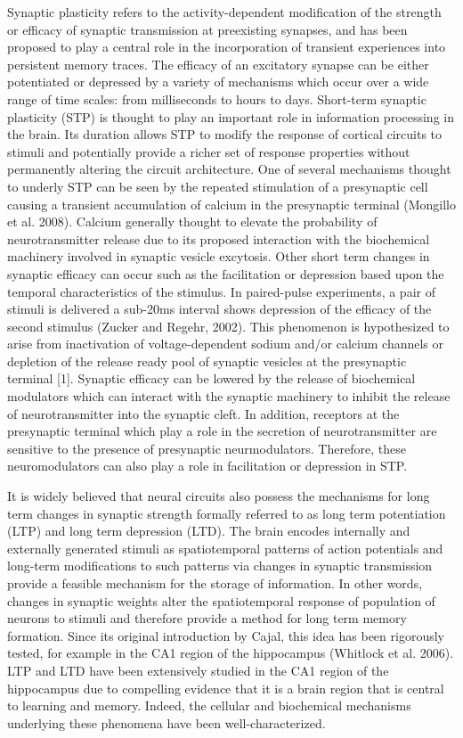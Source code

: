 \documentclass{ucetd}
\begin{document}
Synaptic plasticity refers to the activity-dependent modification of the strength or efficacy of synaptic transmission at preexisting synapses, and has been proposed to play a central role in the incorporation of transient experiences into persistent memory traces. The efficacy of an excitatory synapse can be either potentiated or depressed by a variety of mechanisms which occur over a wide range of time scales: from milliseconds to hours to days. Short-term synaptic plasticity (STP) is thought to play an important role in information processing in the brain. Its duration allows STP to modify the response of cortical circuits to stimuli and potentially provide a richer set of response properties without permanently altering the circuit architecture. One of several mechanisms thought to underly STP can be seen by the repeated stimulation of a presynaptic cell causing a transient accumulation of calcium in the presynaptic terminal (Mongillo et al. 2008). Calcium generally thought to elevate the probability of neurotransmitter release due to its proposed interaction with the biochemical machinery involved in synaptic vesicle excytosis. Other short term changes in synaptic efficacy can occur such as the facilitation or depression based upon the temporal characteristics of the stimulus. In paired-pulse experiments, a pair of stimuli is delivered a sub-20ms interval shows depression of the efficacy of the second stimulus (Zucker and Regehr, 2002). This phenomenon is hypothesized to arise from inactivation of voltage-dependent sodium and/or calcium channels or depletion of the release ready pool of synaptic vesicles at the presynaptic terminal [1]. Synaptic efficacy can be lowered by the release of biochemical modulators which can interact with the synaptic machinery to inhibit the release of neurotransmitter into the synaptic cleft. In addition, receptors at the presynaptic terminal which play a role in the secretion of neurotransmitter are sensitive to the presence of presynaptic neurmodulators. Therefore, these neuromodulators can also play a role in facilitation or depression in STP.

It is widely believed that neural circuits also possess the mechanisms for long term changes in synaptic strength formally referred to as long term potentiation (LTP) and long term depression (LTD). The brain encodes internally and externally generated stimuli as spatiotemporal patterns of action potentials and long-term modifications to such patterns via changes in synaptic transmission provide a feasible mechanism for the storage of information. In other words, changes in synaptic weights alter the spatiotemporal response of population of neurons to stimuli and therefore provide a method for long term memory formation. Since its original introduction by Cajal, this idea has been rigorously tested, for example in the CA1 region of the hippocampus (Whitlock et al. 2006). LTP and LTD have been extensively studied in the CA1 region of the hippocampus due to compelling evidence that it is a brain region that is central to learning and memory. Indeed, the cellular and biochemical mechanisms underlying these phenomena have been well-characterized. 
\end{document}
